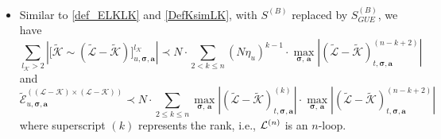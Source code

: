 \documentclass[10pt,reqno]{article}
\theoremstyle{plain} %
\theoremstyle{remark}
\numberwithin{equation}{section}
\begin{document}
   \begin{itemize}
       \item Similar to \eqref{def_ELKLK} and \eqref{DefKsimLK},  with $S^{(B)}$ replaced by $S^{(B)}_{GUE}$, we have 
      \begin{equation}
       \label{WLK2}\sum_{l_\mathcal{K} > 2} \left|\Big[\mathcal{\widetilde{K}} \sim (\mathcal{\widetilde{L}} - \mathcal{\widetilde{K}})\Big]^{l_\mathcal{K}}_{u, \boldsymbol{\sigma},\textbf{a}} \right|
       \prec N\cdot
       \sum_{2<k\le n} (N\eta_u)^{k-1}\cdot \max_{\boldsymbol{\sigma}, \,\textbf{a}}   \left|(\mathcal{\widetilde{L}}-\mathcal{\widetilde{K}})^{(n-k+2)}_{t, \boldsymbol{\sigma}, \textbf{a}}\right|
       \end{equation}
        and  \begin{equation}\label{WLK3}\mathcal{\widetilde{E}}^{((\mathcal{L} - \mathcal{K}) \times (\mathcal{L} - \mathcal{K}))}_{u, \boldsymbol{\sigma}, \textbf{a}}\prec N\cdot \sum_{2\le k\le n} \max_{\boldsymbol{\sigma}, \,\textbf{a}}   \left|(\mathcal{\widetilde{L}}-\mathcal{\widetilde{K}})^{(k)}_{t, \boldsymbol{\sigma}, \textbf{a}}\right|\cdot \max_{\boldsymbol{\sigma}, \,\textbf{a}}   \left|(\mathcal{\widetilde{L}}-\mathcal{\widetilde{K}})^{(n-k+2)}_{t, \boldsymbol{\sigma}, \textbf{a}}\right|
        \end{equation}
      where superscript $(k)$ represents the rank, i.e., ${\cal L}^{(n)}$ is an $n$-loop.        \bigskip


 
 

\end{itemize}
\end{document}
